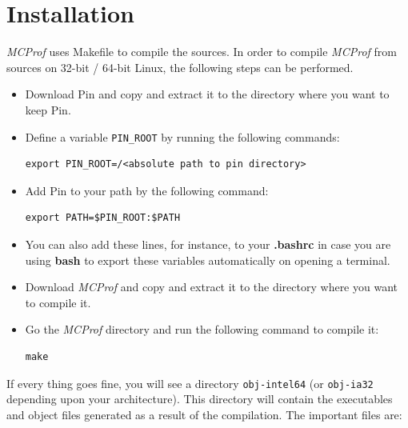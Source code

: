 \documentclass[11pt]{article}
\newcommand{\MCPROF}{\emph{MCProf}}
\begin{document}
\section{Installation}
\label{sec:installation}

\MCPROF{} uses Makefile to compile the sources. In order to compile \MCPROF{}
from sources on 32-bit / 64-bit Linux, the following steps can be performed.

\begin{itemize}

\item Download Pin and copy and extract it to the directory where you want to
    keep Pin.

\item Define a variable \verb|PIN_ROOT| by running the following commands:

{
\small
\begin{Verbatim}[frame=single]
export PIN_ROOT=/<absolute path to pin directory>
\end{Verbatim}
}

\item Add Pin to your path by the following command:
{
\small
\begin{Verbatim}[frame=single]
export PATH=$PIN_ROOT:$PATH
\end{Verbatim}
}

\item You can also add these lines, for instance, to your \textbf{.bashrc} in case
    you are using \textbf{bash} to export these variables automatically on opening
    a terminal.

\item Download \MCPROF{} and copy and extract it to the directory where you want
    to compile it.

\item Go the \MCPROF{} directory and run the following command to compile it:

{
\small
\begin{Verbatim}[frame=single]
make
\end{Verbatim}
}

\end{itemize}

If every thing goes fine, you will see a directory \verb|obj-intel64| (or
\verb|obj-ia32| depending upon your architecture). This directory will contain
the executables and object files generated as a result of the compilation. The
important files are:
\end{document}
